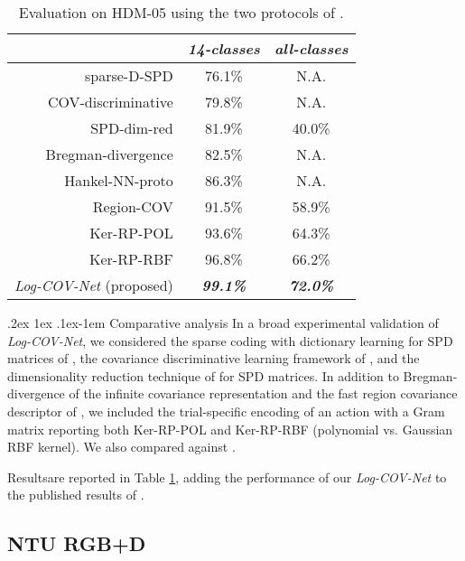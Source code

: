 \documentclass[10pt,twocolumn]{article}
\makeatletter
\renewcommand{\paragraph}{%
	\@startsection{paragraph}{4}%
	{\z@}{.2ex \@plus 1ex \@minus .1ex}{-1em}%
	{\normalfont\normalsize\bfseries}%
}
\makeatother
\begin{document}
\begin{table}[h!]
	\centering
	\begin{tabular}{|rcc|}
		\hline
		& \textit{14-classes} & \textit{all-classes} \\ \hline\hline
		sparse-D-SPD \cite{Har1} & 76.1\% & N.A. \\
		COV-discriminative \cite{COVdiscr} & 79.8\% & N.A. \\
		SPD-dim-red \cite{Har2} & 81.9\% & 40.0\% \\
		Bregman-divergence \cite{Harandi:CVPR14}  & 82.5\% & N.A. \\
		Hankel-NN-proto \cite{Camps:CVPR16} & 86.3\% & N.A. \\
		Region-COV \cite{Tuzel} & 91.5\% & 58.9\% \\
		Ker-RP-POL \cite{Wang:ICCV15} & 93.6\% & 64.3\% \\
		Ker-RP-RBF \cite{Wang:ICCV15} & 96.8\% & 66.2\% \\ \hline \hline
		\textit{\textit{Log-COV-Net} } (proposed) & \textit{\textbf{99.1\%}} & \textit{\textbf{72.0\%}} \\ \hline
	\end{tabular}\vspace{5pt}
	\caption{Evaluation on HDM-05 using the two protocols of \cite{Wang:ICCV15}.}
	\label{tab:05}
\end{table}

\paragraph{Comparative analysis} In a broad experimental validation of \textit{Log-COV-Net}, we considered the sparse coding with dictionary learning for SPD matrices of \cite{Har1}, the covariance discriminative learning framework of \cite{COVdiscr}, and the dimensionality reduction technique of \cite{Har2} for SPD matrices. In addition to Bregman-divergence of the infinite covariance representation \cite{Harandi:CVPR14} and the fast region covariance descriptor of \cite{Tuzel}, we included the trial-specific encoding of an action with a Gram matrix \cite{Wang:ICCV15} reporting both Ker-RP-POL and Ker-RP-RBF (polynomial vs. Gaussian RBF kernel). We also compared against \cite{Camps:CVPR16}.

Resultsare reported in Table \ref{tab:05}, adding the performance of our \textit{Log-COV-Net} to the published results of \cite[Table 4.]{Wang:ICCV15}.



\subsection{NTU RGB+D}\label{sez:NTU}
\end{document}
